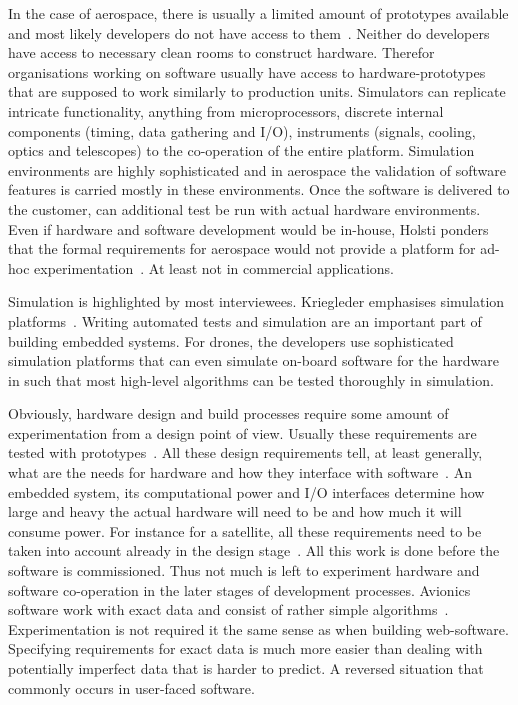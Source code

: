 \documentclass[english]{tktltiki2}
\begin{document}
In the case of aerospace, there is usually a limited amount of prototypes available and most likely developers do not have access to them~\cite{Hol15b}. Neither do developers have access to necessary clean rooms to construct hardware. Therefor organisations working on software usually have access to hardware-prototypes that are supposed to work similarly to production units. Simulators can replicate intricate functionality, anything from microprocessors, discrete internal components (timing, data gathering and I/O), instruments (signals, cooling, optics and telescopes) to the co-operation of the entire platform. Simulation environments are highly sophisticated and in aerospace the validation of software features is carried mostly in these environments. Once the software is delivered to the customer, can additional test be run with actual hardware environments. Even if hardware and software development would be in-house, Holsti ponders that the formal requirements for aerospace would not provide a platform for ad-hoc experimentation~\cite{Hol15b}. At least not in commercial applications.

Simulation is highlighted by most interviewees. Kriegleder emphasises simulation platforms~\cite{Kri15}. Writing automated tests and simulation are an important part of building embedded systems. For drones, the developers use sophisticated simulation platforms that can even simulate on-board software for the hardware in such that most high-level algorithms can be tested thoroughly in simulation.

Obviously, hardware design and build processes require some amount of experimentation from a design point of view. Usually these requirements are tested with prototypes~\cite{BT15, Hol15a, Hol15b, Koi15, Kri15, Pet15}. All these design requirements tell, at least generally, what are the needs for hardware and how they interface with software~\cite{Hol15b}. An embedded system, its computational power and I/O interfaces determine how large and heavy the actual hardware will need to be and how much it will consume power. For instance for a satellite, all these requirements need to be taken into account already in the design stage~\cite{Hol15b}. All this work is done before the software is commissioned. Thus not much is left to experiment hardware and software co-operation in the later stages of development processes. Avionics software work with exact data and consist of rather simple algorithms~\cite{Hol15b}. Experimentation is not required it the same sense as when building web-software. Specifying requirements for exact data is much more easier than dealing with potentially imperfect data that is harder to predict. A reversed situation that commonly occurs in user-faced software.
\end{document}

